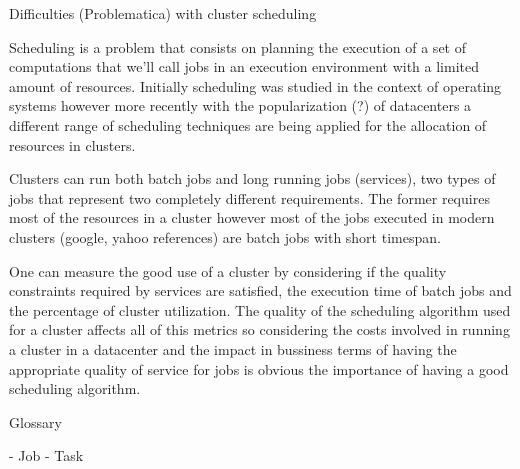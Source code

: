 
Difficulties (Problematica) with cluster scheduling


Scheduling is a problem that consists on planning the execution of a
set of computations that we'll call jobs in an execution environment
with a limited amount of resources. Initially scheduling was studied
in the context of operating systems however more recently with the
popularization (?) of datacenters a different range of scheduling
techniques are being applied for the allocation of resources in
clusters. 

Clusters can run both batch jobs and long running jobs (services), two
types of jobs that represent two completely different requirements.
The former requires most of the resources in a cluster however most of
the jobs executed in modern clusters (google, yahoo references) are
batch jobs with short timespan.

One can measure the good use of a cluster by considering if the
quality constraints required by services are satisfied, the execution
time of batch jobs and the percentage of cluster utilization. The
quality of the scheduling algorithm used for a cluster affects all of
this metrics so considering the costs involved in running a cluster in
a datacenter and the impact in bussiness terms of having the
appropriate quality of service for jobs is obvious the importance of
having a good scheduling algorithm. 




Glossary

- Job
- Task
